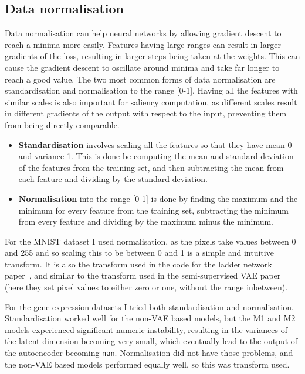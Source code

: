 \documentclass[12pt,a4paper,twoside,openright]{report}
\begin{document}
\subsection{Data normalisation}

Data normalisation can help neural networks by allowing gradient descent to reach a minima more easily. Features having large ranges
can result in larger gradients of the loss, resulting in larger steps being taken at the weights. This can cause the 
gradient descent to oscillate around minima and take far longer to reach a good value. The two most common forms of data normalisation 
are standardisation and normalisation to the range [0-1]. Having all the features with similar scales is also important for saliency computation,
as different scales result in different gradients of the output with respect to the input, preventing them from being directly comparable.

\begin{itemize}
  \item \textbf{Standardisation} involves scaling all the features so that they have mean 0 and variance 1. This is done be computing the mean 
          and standard deviation of the features from the training set, and then subtracting the mean from each feature and dividing by the
          standard deviation.
  \item \textbf{Normalisation} into the range [0-1] is done by finding the maximum and the minimum for every feature from the training set,
          subtracting the minimum from every feature and dividing by the maximum minus the minimum.
\end{itemize}

For the MNIST dataset I used normalisation, as the pixels take values between 0 and 255 and so scaling this to be between 0 and 1 is 
a simple and intuitive transform. It is also the transform used in the code for the ladder network paper~\cite{DBLP:journals/corr/RasmusVHBR15}, 
and similar to the transform used in the semi-supervised VAE paper~\cite{DBLP:journals/corr/KingmaRMW14} (here they set pixel values to 
either zero or one, without the range inbetween).

For the gene expression datasets I tried both standardisation and normalisation. Standardisation worked well for the non-VAE based models,
but the M1 and M2 models experienced significant numeric instability, resulting in the variances of the latent dimension becoming very small,
which eventually lead to the output of the autoencoder becoming \texttt{nan}. Normalisation did not have those problems, and the non-VAE
based models performed equally well, so this was transform used.
\end{document}
